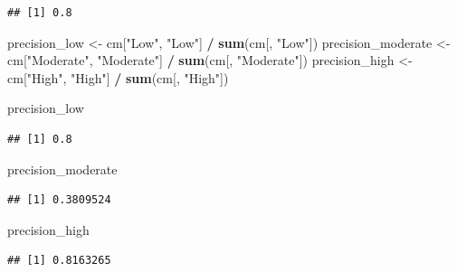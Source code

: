 \documentclass[
]{article}
\newenvironment{Shaded}{\begin{snugshade}}{\end{snugshade}}
\newcommand{\FunctionTok}[1]{\textcolor[rgb]{0.13,0.29,0.53}{\textbf{#1}}}
\newcommand{\NormalTok}[1]{#1}
\newcommand{\OtherTok}[1]{\textcolor[rgb]{0.56,0.35,0.01}{#1}}
\newcommand{\SpecialCharTok}[1]{\textcolor[rgb]{0.81,0.36,0.00}{\textbf{#1}}}
\newcommand{\StringTok}[1]{\textcolor[rgb]{0.31,0.60,0.02}{#1}}
\begin{document}
\begin{verbatim}
## [1] 0.8
\end{verbatim}

\begin{Shaded}
\begin{Highlighting}[]
\NormalTok{precision\_low }\OtherTok{\textless{}{-}}\NormalTok{ cm[}\StringTok{"Low"}\NormalTok{, }\StringTok{"Low"}\NormalTok{] }\SpecialCharTok{/} \FunctionTok{sum}\NormalTok{(cm[, }\StringTok{"Low"}\NormalTok{])}
\NormalTok{precision\_moderate }\OtherTok{\textless{}{-}}\NormalTok{ cm[}\StringTok{"Moderate"}\NormalTok{, }\StringTok{"Moderate"}\NormalTok{] }\SpecialCharTok{/} \FunctionTok{sum}\NormalTok{(cm[, }\StringTok{"Moderate"}\NormalTok{])}
\NormalTok{precision\_high }\OtherTok{\textless{}{-}}\NormalTok{ cm[}\StringTok{"High"}\NormalTok{, }\StringTok{"High"}\NormalTok{] }\SpecialCharTok{/} \FunctionTok{sum}\NormalTok{(cm[, }\StringTok{"High"}\NormalTok{])}

\NormalTok{precision\_low}
\end{Highlighting}
\end{Shaded}

\begin{verbatim}
## [1] 0.8
\end{verbatim}

\begin{Shaded}
\begin{Highlighting}[]
\NormalTok{precision\_moderate}
\end{Highlighting}
\end{Shaded}

\begin{verbatim}
## [1] 0.3809524
\end{verbatim}

\begin{Shaded}
\begin{Highlighting}[]
\NormalTok{precision\_high}
\end{Highlighting}
\end{Shaded}

\begin{verbatim}
## [1] 0.8163265
\end{verbatim}
\end{document}
